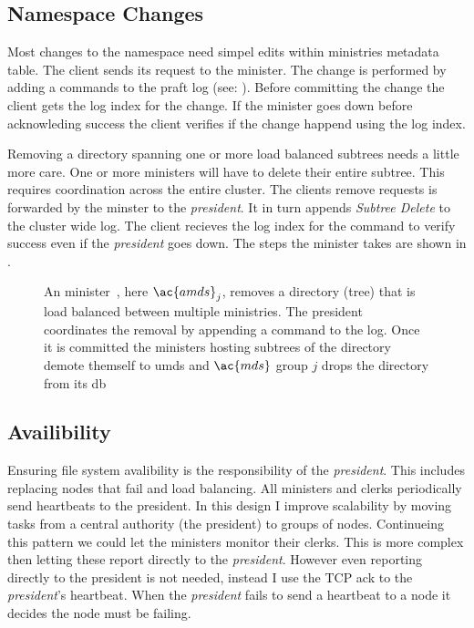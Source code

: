 \subsection*{Namespace Changes}
Most changes to the namespace need simpel edits within ministries metadata table. The client sends its request to the minister. The change is performed by adding a commands to the \ac{praft} log (see: ). Before committing the change the client gets the log index for the change. If the minister goes down before acknowleding success the client verifies if the change happend using the log index.

Removing a directory spanning one or more load balanced subtrees needs a little more care. One or more ministers will have to delete their entire subtree. This requires coordination across the entire cluster. The clients remove requests is forwarded by the minster to the \textit{president}. It in turn appends \textsl{Subtree Delete} to the cluster wide log. The client recieves the log index for the command to verify success even if the \textit{president} goes down. The steps the minister takes are shown in . 
%
\begin{figure}[htbp]
	\centering
	
	\caption{An minister~\amdsLeg{}, here $\ac{amds}_j$, removes a directory (tree) that is load balanced between multiple ministries. The president~\presidentLeg{} coordinates the removal by appending a command to the log. Once it is committed the ministers hosting subtrees of the directory demote themself to \ac{umds} and $\ac{mds}$ group $j$ drops the directory from its db}
	\label{fig:rm}
\end{figure}
%
\subsection{Availibility}
Ensuring file system avalibility is the responsibility of the \textit{president}. This includes replacing nodes that fail and load balancing. All ministers and clerks periodically send heartbeats to the president. In this design I improve scalability by moving tasks from a central authority (the president) to groups of nodes. Continueing this pattern we could let the ministers monitor their clerks. This is more complex then letting these report directly to the \textit{president}. However even reporting directly to the president is not needed, instead I use the TCP ack to the \textit{president}'s \raft{} heartbeat. When the \textit{president} fails to send a \raft{} heartbeat to a node it decides the node must be failing.

